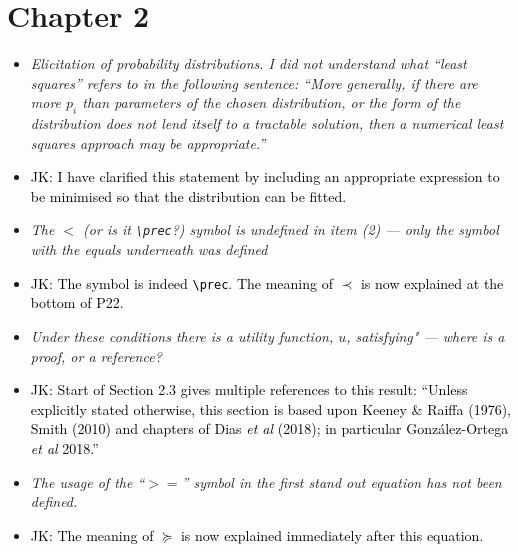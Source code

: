 \documentclass[12pt]{article}
\newcommand{\done}[2]{\item[#1]\textit{#2}}
\newcommand{\jack}[1]{\item{\textcolor{black}{JK: #1}}}
\begin{document}
\section{Chapter 2}
\begin{itemize}

\done{P15}{Elicitation of probability distributions.  I did not understand what ``least squares'' refers to in the following sentence:  ``More generally, if there are more $p_i$ than parameters of the chosen distribution, or the form of the distribution does not lend itself to a tractable solution, then a numerical least squares approach may be appropriate.''}
\jack{I have clarified this statement by including an appropriate expression to be minimised so that the distribution can be fitted.}

\done{P23}{The $<$ (or is it \texttt{\textbackslash prec}?) symbol is undefined in item (2) --- only the symbol with the equals underneath was defined}
\jack{The symbol is indeed \texttt{\textbackslash prec}. The meaning of $\prec$ is now explained at the bottom of P22.}

\done{P23}{Under these conditions there is a utility function, $u$, satisfying" --- where is a proof, or a reference?}

\jack{Start of Section 2.3 gives multiple references to this result: ``Unless explicitly stated otherwise, this section is based upon Keeney \& Raiffa (1976), Smith (2010) and chapters of Dias \textit{et al} (2018); in particular Gonz\'alez-Ortega \textit{et al} 2018.''}

\done{P25}{The usage of the ``$> =$'' symbol in the first stand out equation has not been defined.}

\jack{The meaning of $\succeq$ is now explained immediately after this equation.}

\end{itemize}
\newpage
\end{document}

